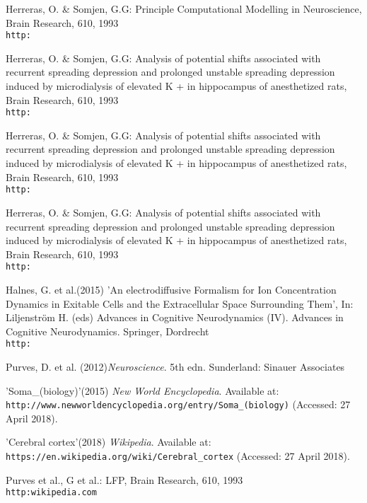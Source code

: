 \documentclass{article}
\begin{document}
\begin{thebibliography}{1}
Herreras, O. \& Somjen, G.G: Principle Computational Modelling in Neuroscience,
Brain Research, 610, 1993
\\\texttt{http:}

Herreras, O. \& Somjen, G.G: Analysis of potential shifts associated with recurrent spreading
depression and prolonged unstable spreading depression induced by
microdialysis of elevated K + in hippocampus of anesthetized rats,
Brain Research, 610, 1993
\\\texttt{http:}

Herreras, O. \& Somjen, G.G: Analysis of potential shifts associated with recurrent spreading
depression and prolonged unstable spreading depression induced by
microdialysis of elevated K + in hippocampus of anesthetized rats,
Brain Research, 610, 1993
\\\texttt{http:}

Herreras, O. \& Somjen, G.G: Analysis of potential shifts associated with recurrent spreading
depression and prolonged unstable spreading depression induced by
microdialysis of elevated K + in hippocampus of anesthetized rats,
Brain Research, 610, 1993
\\\texttt{http:}



Halnes, G. et al.(2015) 'An electrodiffusive Formalism for Ion Concentration Dynamics in Exitable Cells and the Extracellular Space Surrounding Them',
In: Liljenström H. (eds) Advances in Cognitive Neurodynamics (IV). Advances in Cognitive Neurodynamics. Springer, Dordrecht
\\\texttt{http:}

Purves, D. et al. (2012)\textit{Neuroscience}. 5th edn.
Sunderland: Sinauer Associates


'Soma\_(biology)'(2015) \textit{New World Encyclopedia}. Available at:
\\\texttt{http://www.newworldencyclopedia.org/entry/Soma\_(biology)} (Accessed: 27 April 2018).

'Cerebral cortex'(2018) \textit{Wikipedia}. Available at:
\\\texttt{https://en.wikipedia.org/wiki/Cerebral\_cortex} (Accessed: 27 April 2018).


Purves et al., G et al.: LFP,
Brain Research, 610, 1993
\\\texttt{http:wikipedia.com}




\end{thebibliography}
\end{document}
